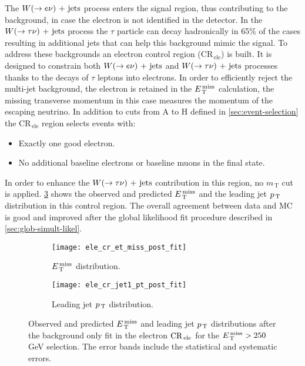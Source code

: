The $W (\rightarrow e \nu)\mathrm{~+~jets}$ process enters the signal region, thus contributing to the
background, in case the electron is not identified in the detector. In the
$W (\rightarrow \tau \nu)\mathrm{~+~jets}$ process the $\tau$ particle can decay hadronically in 65\% of
the cases resulting in additional jets that can help this background mimic the
signal. To address these backgrounds an electron control region
(CR$_\mathrm{\, ele}$) is built. It is designed to constrain both
$W (\rightarrow e \nu)\mathrm{~+~jets}$ and $W (\rightarrow \tau \nu)\mathrm{~+~jets}$ processes thanks to the decays of $\tau$
leptons into electrons. In order to efficiently reject the multi-jet background,
the electron is retained in the $E_\mathrm{\, T}^\mathrm{\, miss}$ calculation, the missing transverse
momentum in this case measures the momentum of the escaping neutrino. In
addition to cuts from A to H defined in \cref{sec:event-selection} the
CR$_\mathrm{\, ele}$ region selects events with:
\begin{itemize}
\item Exactly one good electron.
\item No additional baseline electrons or baseline muons in the final state.
\end{itemize}
In order to enhance the $W (\rightarrow \tau \nu)\mathrm{~+~jets}$ contribution in this region, no
$m_\mathrm{\, T}$ cut is applied. \cref{fig:ele_cr_plots} shows the observed and
predicted $E_\mathrm{\, T}^\mathrm{\, miss}$ and the leading jet $p_\mathrm{\, T}$ distribution in this control region. The
overall agreement between data and MC is good and improved after the global
likelihood fit procedure described in \cref{sec:glob-simult-likel}.
\begin{figure}[!h]
  \centering
  \begin{subfigure}[t]{.48\linewidth}
    \texttt{[image: ele\_cr\_et\_miss\_post\_fit]}
    \caption{$E_\mathrm{\, T}^\mathrm{\, miss}$ distribution.}
    \label{fig:ele_cr_et_miss_pre_fit}
  \end{subfigure}
  \begin{subfigure}[t]{.48\linewidth}
    \texttt{[image: ele\_cr\_jet1\_pt\_post\_fit]}
    \caption{Leading jet $p_\mathrm{\, T}$ distribution.}
    \label{fig:ele_cr_jet1_pt_pre_fit}
  \end{subfigure}
  \caption{Observed and predicted $E_\mathrm{\, T}^\mathrm{\, miss}$ and leading jet $p_\mathrm{\, T}$ distributions
    after the background only fit in the electron $\mathrm{CR}_\mathrm{\, ele}$ for the
    $E_\mathrm{\, T}^\mathrm{\, miss} > 250~$GeV selection. The error bands include the statistical and
    systematic errors.}
  \label{fig:ele_cr_plots}
\end{figure}
